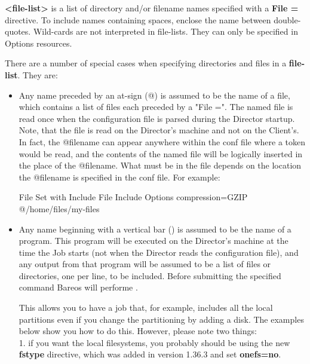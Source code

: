 \begin{description}
{\bf {\textless}file-list{\textgreater}} is a list of directory and/or filename names
specified with a {\bf File =} directive. To include names containing spaces,
enclose the name between double-quotes. Wild-cards are not interpreted
in file-lists. They can only be specified in Options resources.

There are a number of special cases when specifying directories and files in a
{\bf file-list}. They are:

\begin{itemize}
\item Any name preceded by an at-sign (@) is assumed to be the  name of a
   file, which contains a list of files each preceded by a "File =".  The
   named file is read once when the configuration file is parsed during the
   Director startup.  Note, that the file is read on the Director's machine
   and not on the Client's.  In fact, the @filename can appear anywhere
   within the conf file where a token would be read, and the contents of
   the named file will be logically inserted in the place of the @filename.
   What must be in the file depends on the location the @filename is
   specified in the conf file.  For example:

\begin{bconfig}{File Set with Include File}
Include {
  Options {
    compression=GZIP
  }
  @/home/files/my-files
}
\end{bconfig}


\item Any name beginning with a vertical bar ({\textbar}) is  assumed to
   be the name of a program.  This program will be executed on the Director's
   machine at the time the Job starts (not when the Director reads the
   configuration file), and any output from that program will be assumed to
   be a list of files or directories, one per line, to be included. Before
   submitting the specified command Bareos will performe
   .

   This allows you to have a job that, for example, includes all the local
   partitions even if you change the partitioning by adding a disk.  The
   examples below show you how to do this.  However, please note two
   things: \\
   1.  if you want the local filesystems, you probably should be
   using the new {\bf fstype} directive, which was added in version 1.36.3
   and set {\bf onefs=no}.
   \\


\end{itemize}
\end{description}
